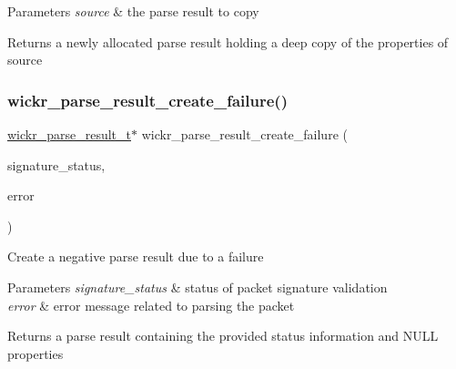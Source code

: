 \begin{DoxyParams}{Parameters}
{\em source} & the parse result to copy \\
\hline
\end{DoxyParams}
\begin{DoxyReturn}{Returns}
a newly allocated parse result holding a deep copy of the properties of \textquotesingle{}source\textquotesingle{} 
\end{DoxyReturn}
\mbox{\label{group__wickr__protocol_gac2673bcfeae2f8d693e523809bb6bb30}} 
\subsubsection{\texorpdfstring{wickr\+\_\+parse\+\_\+result\+\_\+create\+\_\+failure()}{wickr\_parse\_result\_create\_failure()}}
{\footnotesize\ttfamily \mbox{\hyperlink{structwickr__parse__result}{wickr\+\_\+parse\+\_\+result\+\_\+t}}$\ast$ wickr\+\_\+parse\+\_\+result\+\_\+create\+\_\+failure (\begin{DoxyParamCaption}\item[{wickr\+\_\+packet\+\_\+signature\+\_\+status}]{signature\+\_\+status,  }\item[{wickr\+\_\+decode\+\_\+error}]{error }\end{DoxyParamCaption})}

Create a negative parse result due to a failure


\begin{DoxyParams}{Parameters}
{\em signature\+\_\+status} & status of packet signature validation \\
\hline
{\em error} & error message related to parsing the packet \\
\hline
\end{DoxyParams}
\begin{DoxyReturn}{Returns}
a parse result containing the provided status information and N\+U\+LL properties 
\end{DoxyReturn}
\mbox{\label{group__wickr__protocol_gae9d6837e2cea5b64993c124e671bd25f}} 
